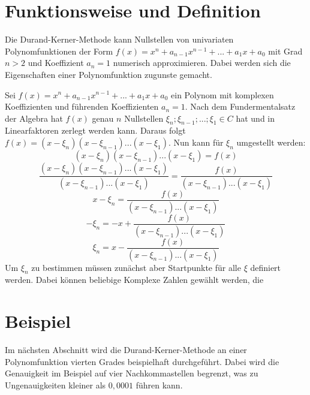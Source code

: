 \documentclass[12pt]{article}
\begin{document}
\section{Funktionsweise und Definition}
Die Durand-Kerner-Methode kann Nullstellen von univariaten Polynomfunktionen der Form $f(x) = x^n + a_{n-1} x^{n-1} + ... + a_1 x + a_0$ mit Grad $n > 2$ und Koeffizient $a_n = 1$ numerisch approximieren. Dabei werden sich die Eigenschaften einer Polynomfunktion zugunste gemacht.

Sei $f(x) = x^n + a_{n-1} x^{n-1} + ... + a_1 x + a_0$ ein Polynom mit komplexen Koeffizienten und führenden Koeffizienten $a_n = 1$. Nach dem Fundermentalsatz der Algebra hat $f(x)$ genau $n$ Nullstellen $\xi_n;\xi_{n-1};...;\xi_1 \in C$ hat und in Linearfaktoren zerlegt werden kann. Daraus folgt $f(x) = (x - \xi_n)(x - \xi_{n-1})...(x - \xi_1)$. Nun kann für $\xi_n$ umgestellt werden:
\begin{displaymath}
    (x - \xi_n)(x - \xi_{n-1})...(x - \xi_1) = f(x)
\end{displaymath}
\begin{displaymath}
    \frac{(x - \xi_n)(x - \xi_{n-1})...(x - \xi_1)}{(x - \xi_{n-1})...(x - \xi_1)} = \frac{f(x)}{(x - \xi_{n-1})...(x - \xi_1)}
\end{displaymath}
\begin{displaymath}
    x - \xi_n = \frac{f(x)}{(x - \xi_{n-1})...(x - \xi_1)}
\end{displaymath}
\begin{displaymath}
    - \xi_n = - x + \frac{f(x)}{(x - \xi_{n-1})...(x - \xi_1)}
\end{displaymath}
\begin{displaymath}
    \xi_n = x - \frac{f(x)}{(x - \xi_{n-1})...(x - \xi_1)}
\end{displaymath}
Um $\xi_n$ zu bestimmen müssen zunächst aber Startpunkte für alle $\xi$ definiert werden. Dabei können beliebige Komplexe Zahlen gewählt werden, die 

\section{Beispiel}
Im nächsten Abschnitt wird die Durand-Kerner-Methode an einer Polynomfunktion vierten Grades beispielhaft durchgeführt. Dabei wird die Genauigkeit im Beispiel auf vier Nachkommastellen begrenzt, was zu Ungenauigkeiten kleiner als $0,0001$ führen kann.
\end{document}
